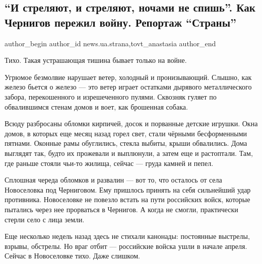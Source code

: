  
 
 
 
 
 
\subsection{\enquote{И стреляют, и стреляют, ночами не спишь}. Как Чернигов пережил войну. Репортаж \enquote{Страны}}
\label{sec:17_04_2022.stz.news.ua.strana.1.chernigov}
 
\ifcmt
 author_begin
   author_id news.ua.strana,tovt_anastasia
 author_end
\fi

Тихо. Такая устрашающая тишина бывает только на войне.

Угрюмое безмолвие нарушает ветер, холодный и пронизывающий. Слышно, как железо
бьется о железо — это ветер играет остатками дырявого металлического забора,
перекошенного и изрешеченного пулями. Сквозняк гуляет по обвалившимся стенам
домов и воет, как брошенная собака.


Всюду разбросаны обломки кирпичей, досок и порванные детские игрушки. Окна
домов, в которых еще месяц назад горел свет, стали чёрными бесформенными
пятнами. Оконные рамы обуглились, стекла выбиты, крыши обвалились. Дома
выглядят так, будто их прожевали и выплюнули, а затем еще и растоптали. Там,
где раньше стояли чьи-то жилища, сейчас — груда камней и пепел. 

Сплошная череда обломков и развалин — вот то, что осталось от села Новоселовка
под Черниговом. Ему пришлось принять на себя сильнейший удар противника.
Новоселовке не повезло встать на пути российских войск, которые пытались через
нее прорваться в Чернигов. А когда не смогли, практически стерли село с лица
земли. 

Еще несколько недель назад здесь не стихали канонады: постоянные выстрелы,
взрывы, обстрелы. Но враг отбит — российские войска ушли в начале апреля.
Сейчас в Новоселовке тихо. Даже слишком. 

